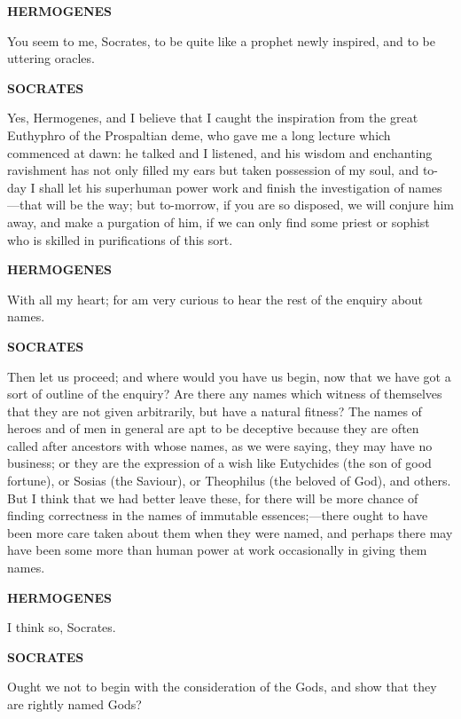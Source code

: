\documentclass[11pt,letter]{article}
\begin{document}
\par \textbf{HERMOGENES}
\par   You seem to me, Socrates, to be quite like a prophet newly inspired, and to be uttering oracles.

\par \textbf{SOCRATES}
\par   Yes, Hermogenes, and I believe that I caught the inspiration from the great Euthyphro of the Prospaltian deme, who gave me a long lecture which commenced at dawn:  he talked and I listened, and his wisdom and enchanting ravishment has not only filled my ears but taken possession of my soul, and to-day I shall let his superhuman power work and finish the investigation of names—that will be the way; but to-morrow, if you are so disposed, we will conjure him away, and make a purgation of him, if we can only find some priest or sophist who is skilled in purifications of this sort.

\par \textbf{HERMOGENES}
\par   With all my heart; for am very curious to hear the rest of the enquiry about names.

\par \textbf{SOCRATES}
\par   Then let us proceed; and where would you have us begin, now that we have got a sort of outline of the enquiry? Are there any names which witness of themselves that they are not given arbitrarily, but have a natural fitness? The names of heroes and of men in general are apt to be deceptive because they are often called after ancestors with whose names, as we were saying, they may have no business; or they are the expression of a wish like Eutychides (the son of good fortune), or Sosias (the Saviour), or Theophilus (the beloved of God), and others. But I think that we had better leave these, for there will be more chance of finding correctness in the names of immutable essences;—there ought to have been more care taken about them when they were named, and perhaps there may have been some more than human power at work occasionally in giving them names.

\par \textbf{HERMOGENES}
\par   I think so, Socrates.

\par \textbf{SOCRATES}
\par   Ought we not to begin with the consideration of the Gods, and show that they are rightly named Gods?
\end{document}
